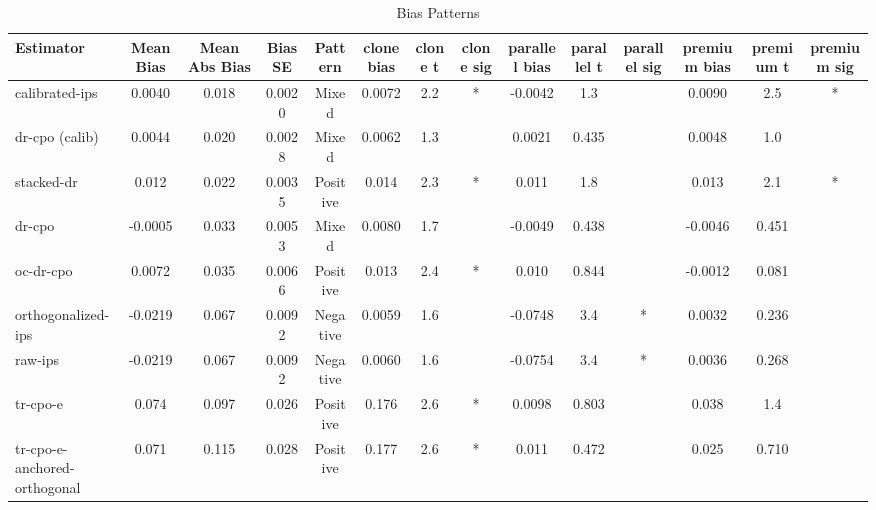 \begin{table}[htbp]
\centering
\caption{Bias Patterns}
\label{tab:A2}
\begin{tabular}{l|ccccccccccccc}
\toprule
Estimator & Mean Bias & Mean Abs Bias & Bias SE & Pattern & clone bias & clone t & clone sig & parallel bias & parallel t & parallel sig & premium bias & premium t & premium sig \\
\midrule
calibrated-ips & 0.0040 & 0.018 & 0.0020 & Mixed & 0.0072 & 2.2 & * & -0.0042 & 1.3 &  & 0.0090 & 2.5 & * \\
dr-cpo (calib) & 0.0044 & 0.020 & 0.0028 & Mixed & 0.0062 & 1.3 &  & 0.0021 & 0.435 &  & 0.0048 & 1.0 &  \\
stacked-dr & 0.012 & 0.022 & 0.0035 & Positive & 0.014 & 2.3 & * & 0.011 & 1.8 &  & 0.013 & 2.1 & * \\
dr-cpo & -0.0005 & 0.033 & 0.0053 & Mixed & 0.0080 & 1.7 &  & -0.0049 & 0.438 &  & -0.0046 & 0.451 &  \\
oc-dr-cpo & 0.0072 & 0.035 & 0.0066 & Positive & 0.013 & 2.4 & * & 0.010 & 0.844 &  & -0.0012 & 0.081 &  \\
orthogonalized-ips & -0.0219 & 0.067 & 0.0092 & Negative & 0.0059 & 1.6 &  & -0.0748 & 3.4 & * & 0.0032 & 0.236 &  \\
raw-ips & -0.0219 & 0.067 & 0.0092 & Negative & 0.0060 & 1.6 &  & -0.0754 & 3.4 & * & 0.0036 & 0.268 &  \\
tr-cpo-e & 0.074 & 0.097 & 0.026 & Positive & 0.176 & 2.6 & * & 0.0098 & 0.803 &  & 0.038 & 1.4 &  \\
tr-cpo-e-anchored-orthogonal & 0.071 & 0.115 & 0.028 & Positive & 0.177 & 2.6 & * & 0.011 & 0.472 &  & 0.025 & 0.710 &  \\
\bottomrule
\end{tabular}
\end{table}